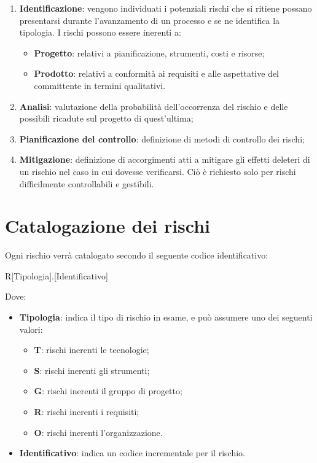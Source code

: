 \documentclass[../PianodiProgetto.tex]{subfiles}
\begin{document}
	\begin{enumerate}
		\item \textbf{Identificazione}: vengono individuati i potenziali rischi che si ritiene possano presentarsi durante
		l’avanzamento di un processo e se ne identifica la tipologia. I rischi possono essere inerenti a: 
		\begin{itemize}
			\item \textbf{Progetto}: relativi a pianificazione, strumenti, costi e risorse;
			\item \textbf{Prodotto}: relativi a conformità ai requisiti e alle aspettative del committente in termini qualitativi.
		\end{itemize}
		\item \textbf{Analisi}: valutazione della probabilità dell’occorrenza del rischio e delle possibili ricadute
		sul progetto di quest'ultima;
		\item \textbf{Pianificazione del controllo}: definizione di metodi di controllo dei rischi;
		\item \textbf{Mitigazione}: definizione di accorgimenti atti a mitigare gli effetti deleteri di un rischio nel caso in cui dovesse verificarsi. Ciò è richiesto solo per rischi
		difficilmente controllabili e gestibili.
	\end{enumerate}

	\section{Catalogazione dei rischi}
	
	Ogni rischio verrà catalogato secondo il seguente codice identificativo:
	
	\begin{center}
		R[Tipologia].[Identificativo]
	\end{center}

	Dove:
	\begin{itemize}
		\item \textbf{Tipologia}: indica il tipo di rischio in esame, e può assumere uno dei seguenti valori:
		\begin{itemize}
			\item \textbf{T}: rischi inerenti le tecnologie;
			\item \textbf{S}: rischi inerenti gli strumenti;
			\item \textbf{G}: rischi inerenti il gruppo di progetto;
			\item \textbf{R}: rischi inerenti i requisiti;
			\item \textbf{O}: rischi inerenti l'organizzazione.
		\end{itemize}
		\item \textbf{Identificativo}: indica un codice incrementale per il rischio.
	\end{itemize}
\end{document}
